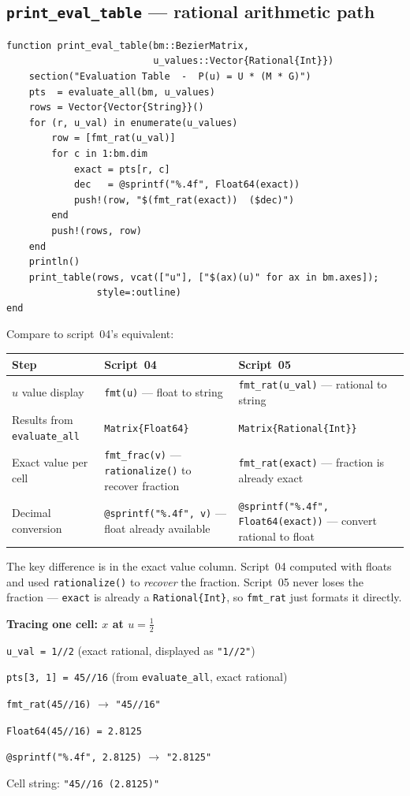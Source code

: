 \documentclass[12pt, a4paper]{article}
\newcommand{\cd}[1]{\texttt{#1}}
\begin{document}
\subsection{\texttt{print\_eval\_table} --- rational arithmetic path}

\begin{verbatim}
function print_eval_table(bm::BezierMatrix,
                          u_values::Vector{Rational{Int}})
    section("Evaluation Table  -  P(u) = U * (M * G)")
    pts  = evaluate_all(bm, u_values)
    rows = Vector{Vector{String}}()
    for (r, u_val) in enumerate(u_values)
        row = [fmt_rat(u_val)]
        for c in 1:bm.dim
            exact = pts[r, c]
            dec   = @sprintf("%.4f", Float64(exact))
            push!(row, "$(fmt_rat(exact))  ($dec)")
        end
        push!(rows, row)
    end
    println()
    print_table(rows, vcat(["u"], ["$(ax)(u)" for ax in bm.axes]);
                style=:outline)
end
\end{verbatim}

Compare to script~04's equivalent:

\begin{center}
\begin{tabular}{lp{4.5cm}p{4.5cm}}
\toprule
Step & Script~04 & Script~05 \\
\midrule
$u$ value display &
  \cd{fmt(u)} --- float to string &
  \cd{fmt\_rat(u\_val)} --- rational to string \\[4pt]
Results from \cd{evaluate\_all} &
  \cd{Matrix\{Float64\}} &
  \cd{Matrix\{Rational\{Int\}\}} \\[4pt]
Exact value per cell &
  \cd{fmt\_frac(v)} --- \cd{rationalize()} to recover fraction &
  \cd{fmt\_rat(exact)} --- fraction is already exact \\[4pt]
Decimal conversion &
  \cd{@sprintf("\%.4f", v)} --- float already available &
  \cd{@sprintf("\%.4f", Float64(exact))} --- convert rational to float \\
\bottomrule
\end{tabular}
\end{center}

The key difference is in the exact value column.
Script~04 computed with floats and used \cd{rationalize()}
to \emph{recover} the fraction.
Script~05 never loses the fraction --- \cd{exact} is already
a \cd{Rational\{Int\}}, so \cd{fmt\_rat} just formats it directly.

\begin{examplebox}
\textbf{Tracing one cell: $x$ at $u = \tfrac{1}{2}$}

\cd{u\_val = 1//2} (exact rational, displayed as \cd{"1//2"})

\cd{pts[3, 1] = 45//16} (from \cd{evaluate\_all}, exact rational)

\cd{fmt\_rat(45//16)} $\to$ \cd{"45//16"}

\cd{Float64(45//16) = 2.8125}

\cd{@sprintf("\%.4f", 2.8125)} $\to$ \cd{"2.8125"}

Cell string: \cd{"45//16  (2.8125)"}
\end{examplebox}
\end{document}
